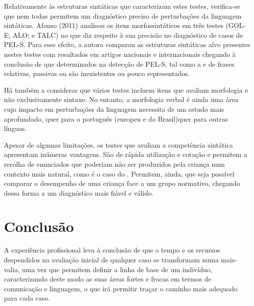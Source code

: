 \documentclass[output=paper]{LSP/langsci}
\begin{document}
Relativamente às estruturas sintáticas que caracterizam estes testes, verifica-se que nem todas permitem um diagnóstico preciso de perturbações da linguagem sintáticas. Afonso (2011) analisou os itens morfossintáticos em três testes (GOL-E; ALO; e TALC) no que diz respeito à sua precisão no diagnóstico de casos de PEL-S. Para esse efeito, a autora comparou as estruturas sintáticas alvo presentes nestes testes com resultados em artigos nacionais e internacionais chegando à conclusão de que determinados  na detecção de PEL-S, tal como a  e  de frases relativas, passivas ou  são inexistentes ou pouco representados. 

Há também a considerar que vários testes incluem itens que avaliam morfologia e não exclusivamente sintaxe. No entanto, a morfologia verbal é ainda uma área cujo impacto em perturbações da linguagem necessita de um estudo mais aprofundado, quer para o português (europeu e do Brasil)\largerpage quer para outras línguas. 

Apesar de algumas limitações, os testes que avaliam a competência sintática apresentam inúmeras vantagens. São de rápida utilização e cotação e permitem a recolha de enunciados que poderiam não ser produzidos pela criança num contexto mais natural, como é o caso do . Permitem, ainda, que seja possível comparar o desempenho de uma criança face a um grupo normativo, chegando dessa forma a um diagnóstico mais fiável e válido.

\section{Conclusão}
\label{sec:martins_conclusao}

A experiência profissional leva à conclusão de que o tempo e os recursos despendidos na avaliação inicial de qualquer caso se transformam numa mais-valia, uma vez que permitem definir a linha de base de um indivíduo, caracterizando deste modo as suas áreas fortes e fracas em termos de comunicação e linguagem, o que irá permitir traçar o caminho mais adequado para cada caso. 
\end{document}
